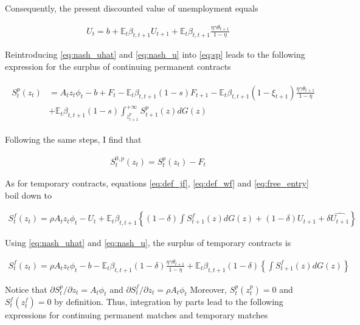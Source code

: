Consequently, the present discounted value of unemployment equals

\begin{align}
U_t = b + \mathbb{E}_t \beta_{t,t+1} U_{t+1} + \mathbb{E}_t \beta_{t,t+1} \frac{\eta \gamma \theta_{t+1}}{1-\eta} \label{eq:nash_u}
\end{align}

Reintroducing \eqref{eq:nash_uhat} and \eqref{eq:nash_u} into \eqref{eq:sp} leads to the following expression for the surplus of continuing permanent contracts

\begin{align}
\begin{split}
S_t^p \left( z_t \right) &= A_t z_t \phi_t - b + F_t - \mathbb{E}_t \beta_{t,t+1} (1-s) F_{t+1} - \mathbb{E}_t \beta_{t,t+1} \left( 1 - \xi_{t+1} \right) \frac{\eta \gamma \theta_{t+1}}{1-\eta}\\
&+ \mathbb{E}_t  \beta_{t,t+1} (1-s) \int_{z_{t+1}^p}^{+\infty} S_{t+1}^p (z) dG(z)
\end{split}
\end{align}

Following the same steps, I find that

\begin{align}
S_t^{0,p} \left( z_t \right) = S_t^p \left( z_t \right) - F_t
\end{align}


As for temporary contracts, equations \eqref{eq:def_jf}, \eqref{eq:def_wf} and \eqref{eq:free_entry} boil down to

\begin{align}
S_t^f \left( z_t \right) = \rho A_t z_t \phi_t - U_t + \mathbb{E}_t \beta_{t,t+1} \left\{ (1-\delta) \int S_{t+1}^f (z) dG(z) + (1-\delta) U_{t+1} + \delta \widehat{U_{t+1}} \right\}
\end{align} 

Using \eqref{eq:nash_uhat} and \eqref{eq:nash_u}, the surplus of temporary contracts is

\begin{align}
S_t^f \left( z_t \right) = \rho A_t z_t \phi_t - b - \mathbb{E}_t \beta_{t,t+1} (1-\delta) \frac{\eta \gamma \theta_{t+1}}{1-\eta} + \mathbb{E}_t \beta_{t,t+1} (1-\delta) \left\{  \int S_{t+1}^f (z) dG(z) \right\} 
\end{align}

Notice that $\partial S_t^p / \partial z_t = A_t \phi_t$ and $\partial S_t^f / \partial z_t = \rho A_t \phi_t$ Moreover, $S_t^p \left( z_t^p \right) = 0$ and $S_t^f \left( z_t^f \right) = 0$ by definition. Thus, integration by parts lead to the following expressions for continuing permanent matches and temporary matches

